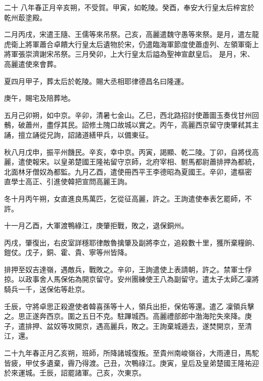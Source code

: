 
\begin{pinyinscope}

 二十
 八年春正月辛亥朔，不受賀。甲寅，如乾陵。癸酉，奉安大行皇太后梓宮於乾州菆塗殿。



 二月丙戌，宋遣王隨、王儒等來吊祭。己亥，高麗遣魏守愚等來祭。是月，遣左龍虎衛上將軍蕭合卓饋大行皇太后遺物於宋，仍遣臨海軍節度使蕭虛列、左領軍衛上將軍張崇濟謝宋吊祭。三月癸卯，上大行皇太后謚為聖神宣獻皇后。
 是月，宋、高麗遣使來會葬。



 夏四月甲子，葬太后於乾陵。賜大丞相耶律德昌名曰隆運。



 庚午，賜宅及陪葬地。



 五月己卯朔，如中京。辛卯，清暑七金山。乙巳，西北路招討使蕭圖玉奏伐甘州回鶻，破蕭州，盡俘其民。詔修土隗口故城以實之。丙午，高麗西京留守庚肇弒其主誦，擅立誦從兄詢，詔諸道繕甲兵，以備東征。



 秋八月戊申，振平州饑民。辛亥，幸中京。丙寅，謁顯、乾二陵。丁卯，自將伐高麗，遣使報宋。以皇弟楚國王隆祐留守京師，北府宰相、駙馬都尉蕭排押為都統，北面林牙僧奴為都監。九月乙酉，遣使冊西平王李德昭為夏國王。辛卯，遣樞密
 直學士高正、引進使韓把宣問高麗王詢。



 冬十月丙午朔，女直進良馬萬匹，乞從征高麗，許之。王詢遣使奉表乞罷師，不許。



 十一月乙酉，大軍渡鴨綠江，庚肇拒戰，敗之，退保銅州。



 丙戌，肇復出，右皮室詳穩耶律敵魯擒肇及副將李立，追殺數十里，獲所棄糧餉、鎧仗。戊子，銅、霍、貴、寧等州皆降。



 排押至奴吉達嶺，遇敵兵，戰敗之。辛卯，王詢遣使上表請朝，許之。禁軍士俘掠。以政事舍人馬保佑為開京留守。安州團練使王八為副留守。遣太子太師乙凜將騎兵一千，送保佑等赴京。



 壬辰，守將卓思正殺遼使者韓喜孫等十人，領兵出拒，保佑等還。遣乙
 凜領兵擊之。思正遂奔西京。圍之五日不克。駐蹕城西。高麗禮部郎中渤海陀失來降。庚子，遣排押、盆奴等攻開京，遇高麗兵，敗之。王詢棄城遁去，遂焚開京，至清江，還。



 二十九年春正月乙亥朔，班師，所降諸城復叛。至貴州南峻嶺谷，大雨連日，馬駝皆疲，甲仗多遺棄，霽乃得渡。己丑，次鴨祿江。庚寅，皇后及皇弟楚國王隆祐迎於來運城。壬辰，詔罷諸軍。己亥，次東京。




\end{pinyinscope}
